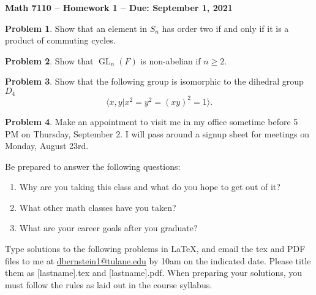 \documentclass[letterpaper,11pt]{amsart}
\theoremstyle{plain}
\theoremstyle{definition}
\newtheorem{pr}{Problem}
\theoremstyle{remark}
\DeclareMathOperator{\gl}{GL}
\begin{document}
\Large

\begin{center}
{\bf Math 7110 -- Homework  1 --  Due:  September 1, 2021}
\end{center}

\normalsize



\medskip


\begin{pr}
    Show that an element in $S_n$ has order two if and only if it is a product of commuting cycles.
\end{pr}

\begin{pr}
    Show that $\gl_n(F)$ is non-abelian if $n \ge 2$.
\end{pr}

\begin{pr}
    Show that the following group is isomorphic to the dihedral group $D_4$
    \[
        \langle x,y | x^2=y^2=(xy)^2=1 \rangle.
    \]
\end{pr}

\begin{pr}
Make an appointment to visit me 
in my office sometime before 5 PM on Thursday, September 2.  I will pass around
a signup sheet for meetings on Monday, August 23rd.

Be prepared
to answer the following questions:
\begin{enumerate}
\item  Why are you taking this class and what do you hope to get out of it?
\item  What other math classes have you taken?
\item  What are your career goals after you graduate?
\end{enumerate}
\end{pr}

\bigskip

Type solutions to the following problems in \LaTeX, and email the tex and PDF files to me at \url{dbernstein1@tulane.edu} by 10am on the indicated date.
Please title them as [lastname].tex and [lastname].pdf.
When preparing your solutions, you must follow the rules as laid out in the course syllabus.

\vspace{.5cm}

\end{document}
